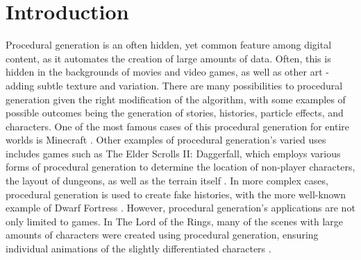 \documentclass[10pt]{report}
\begin{document}
	\clearpage
	
	\tableofcontents
	
	\clearpage
	
	\let\clearpage\relax
	\chapter{Introduction}
		
		Procedural generation is an often hidden, yet common feature among digital content, as it automates the creation of large amounts of data. Often, this is hidden in the backgrounds of movies and video games, as well as other art - adding subtle texture and variation. There are many possibilities to procedural generation given the right modification of the algorithm, with some examples of possible outcomes being the generation of stories, histories, particle effects, and characters. One of the most famous cases of this procedural generation for entire worlds is Minecraft \cite{minecraft-gen}. Other examples of procedural generation's varied uses includes games such as The Elder Scrolls II: Daggerfall, which employs various forms of procedural generation to determine the location of non-player characters, the layout of dungeons, as well as the terrain itself \cite{daggerfall}. In more complex cases, procedural generation is used to create fake histories, with the more well-known example of Dwarf Fortress \cite{df-dev}. However, procedural generation's applications are not only limited to games. In The Lord of the Rings, many of the scenes with large amounts of characters were created using procedural generation, ensuring individual animations of the slightly differentiated characters \cite{massive}.
		
\end{document}

